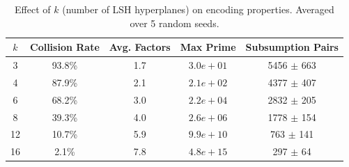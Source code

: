 \begin{table}[h]
\centering
\caption{Effect of $k$ (number of LSH hyperplanes) on encoding properties. Averaged over 5 random seeds.}
\label{tab:ksweep}
\begin{tabular}{ccccc}
\toprule
$k$ & Collision Rate & Avg. Factors & Max Prime & Subsumption Pairs \\
\midrule
3 & 93.8\% & 1.7 & $3.0e+01$ & 5456 $\pm$ 663 \\
4 & 87.9\% & 2.1 & $2.1e+02$ & 4377 $\pm$ 407 \\
6 & 68.2\% & 3.0 & $2.2e+04$ & 2832 $\pm$ 205 \\
8 & 39.3\% & 4.0 & $2.6e+06$ & 1778 $\pm$ 154 \\
12 & 10.7\% & 5.9 & $9.9e+10$ & 763 $\pm$ 141 \\
16 & 2.1\% & 7.8 & $4.8e+15$ & 297 $\pm$ 64 \\
\bottomrule
\end{tabular}
\end{table}
